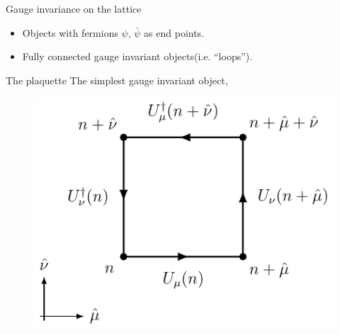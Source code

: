 \documentclass[10pt,show notes on second screen]{beamer}
\begin{document}
\begin{frame}{Gauge invariance on the lattice} %
\begin{block}
    \begin{itemize}
        \item<4-> Objects with fermions $\psi$, $\bar{\psi}$ as end points.
        \item<5-> Fully connected gauge invariant objects(i.e. ``loops'').
    \end{itemize}
\end{block}
\end{frame}

\begin{frame}{The plaquette}
The simplest gauge invariant object,
\begin{figure}
    \centering
    \includegraphics[scale=1]{../figures/illustrations/lqcd/plaquette/plaquette}
\end{figure}
\end{frame}
\end{document}
